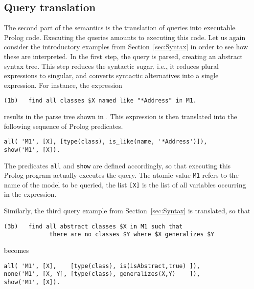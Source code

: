 \documentclass{llncs}
\begin{document}
\subsection{Query translation}\label{sec:QueryTranslation}

The second part of the semantics is the translation of queries into executable Prolog code. Executing the queries amounts to executing this code. Let us again consider the introductory examples from Section~\ref{sec:Syntax} in order to see how these are interpreted. In the first step, the query is parsed, creating an abstract syntax tree. This step reduces the syntactic sugar, i.e., it reduces plural expressions to singular, and converts syntactic alternatives into a single expression. For instance, the expression

\begin{verbatim}
(1b)   find all classes $X named like "*Address" in M1.
\end{verbatim}

results in the parse tree shown in . This expression is then translated into the following sequence of Prolog predicates.

\begin{verbatim}
all( 'M1', [X], [type(class), is_like(name, '*Address')]),
show('M1', [X]).
\end{verbatim}


The predicates \texttt{all} and \texttt{show} are defined accordingly, so that executing this Prolog program actually executes the query. The atomic value \texttt{M1} refers to the name of the model to be queried, the list \texttt{[X]} is the list of all variables occurring in the expression. 

Similarly, the third query example from Section~\ref{sec:Syntax} is translated, so that

\begin{verbatim}
(3b)   find all abstract classes $X in M1 such that 
             there are no classes $Y where $X generalizes $Y
\end{verbatim}

\noindent becomes

\begin{verbatim}
all( 'M1', [X],    [type(class), is(isAbstract,true) ]),
none('M1', [X, Y], [type(class), generalizes(X,Y)    ]),
show('M1', [X]).
\end{verbatim}
\end{document}
